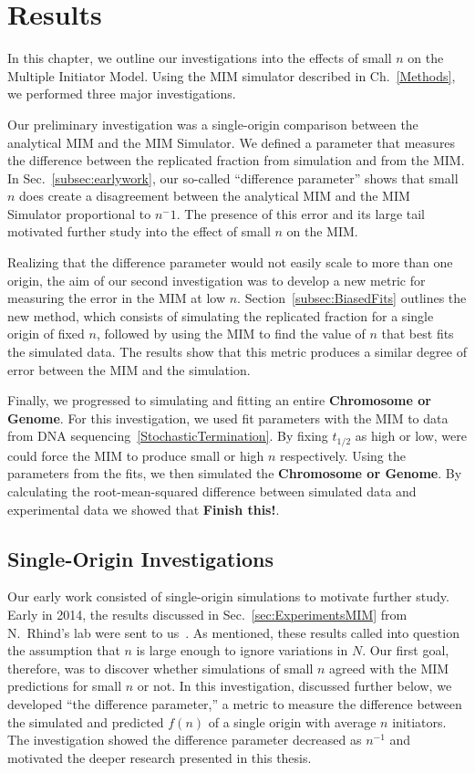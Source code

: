 \chapter{Results}
\label{ch:Results}

In this chapter, we outline our investigations into the effects of small $n$ on the Multiple Initiator Model.
Using the MIM simulator described in Ch.~\ref{Methods}, we performed three major investigations.

Our preliminary investigation was a single-origin comparison between the analytical MIM and the MIM Simulator.
We defined a parameter that measures the difference between the replicated fraction from simulation and from the MIM.
In Sec.~\ref{subsec:earlywork}, our so-called ``difference parameter'' shows that small $n$ does create a disagreement between the analytical MIM and the MIM Simulator proportional to $n^-1$.
The presence of this error and its large tail motivated further study into the effect of small $n$ on the MIM.

Realizing that the difference parameter would not easily scale to more than one origin, the aim of our second investigation was to develop a new metric for measuring the error in the MIM at low $n$.
Section~\ref{subsec:BiasedFits} outlines the new method, which consists of simulating the replicated fraction for a single origin of fixed $n$, followed by using the MIM to find the value of $n$ that best fits the simulated data.
The results show that this metric produces a similar degree of error between the MIM and the simulation.

Finally, we progressed to simulating and fitting an entire \textbf{Chromosome or Genome}.
For this investigation, we used fit parameters with the MIM to data from DNA sequencing~\ref{StochasticTermination}.
By fixing $t_{1/2}$ as high or low, were could force the MIM to produce small or high $n$ respectively.
Using the parameters from the fits, we then simulated the \textbf{Chromosome or Genome}.
By calculating the root-mean-squared difference between simulated data and experimental data we showed that \textbf{Finish this!}.

	\section{Single-Origin Investigations}
	\label{sec:SingleOrigin}
	
	Our early work consisted of single-origin simulations to motivate further study.
	Early in 2014, the results discussed in Sec.~\ref{sec:ExperimentsMIM} from N.~Rhind's lab were sent to us~\cite{Rhind}.
	As mentioned, these results called into question the assumption that $n$ is large enough to ignore variations in $N$.
	Our first goal, therefore, was to discover whether simulations of small $n$ agreed with the MIM predictions for small $n$ or not.
	In this investigation, discussed further below, we developed ``the difference parameter,'' a metric to measure the difference between the simulated and predicted $f(n)$ of a single origin with average $n$ initiators.
	The investigation showed the difference parameter decreased as $n^{-1}$ and motivated the deeper research presented in this thesis.
	
